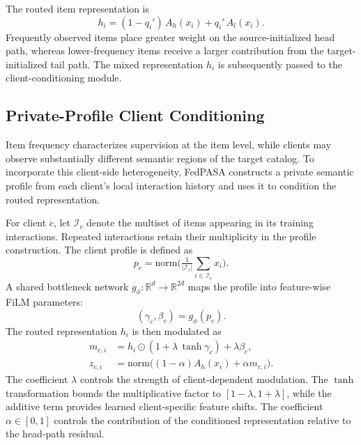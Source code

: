The routed item representation is
\begin{equation}
h_i=(1-q_i')\,A_h(x_i)+q_i'\,A_l(x_i).
\label{eq:routing}
\end{equation}
Frequently observed items place greater weight on the source-initialized head path, whereas lower-frequency items receive a larger contribution from the target-initialized tail path. The mixed representation $h_i$ is subsequently passed to the client-conditioning module.

\subsection{Private-Profile Client Conditioning}
\label{sec:conditioning}

Item frequency characterizes supervision at the item level, while clients may observe substantially different semantic regions of the target catalog. To incorporate this client-side heterogeneity, FedPASA constructs a private semantic profile from each client's local interaction history and uses it to condition the routed representation.

For client $c$, let $\mathcal{I}_c$ denote the multiset of items appearing in its training interactions. Repeated interactions retain their multiplicity in the profile construction. The client profile is defined as
\begin{equation}
p_c=\mathrm{norm}\Big(\tfrac{1}{|\mathcal{I}_c|}\sum_{i\in\mathcal{I}_c} x_i\Big).
\label{eq:profile}
\end{equation}
A shared bottleneck network $g_\phi:\mathbb{R}^d\!\to\!\mathbb{R}^{2d}$ maps the profile into feature-wise FiLM parameters:
\begin{equation}
(\gamma_c,\beta_c)=g_\phi(p_c).
\label{eq:filmparams}
\end{equation}
The routed representation $h_i$ is then modulated as
\begin{equation}
\begin{aligned}
m_{c,i}&=h_i\odot(1+\lambda\,\tanh\gamma_c)+\lambda\beta_c,\\
z_{c,i}&=\mathrm{norm}\big((1-\alpha)A_h(x_i)+\alpha m_{c,i}\big).
\end{aligned}
\label{eq:film}
\end{equation}
The coefficient $\lambda$ controls the strength of client-dependent modulation. The $\tanh$ transformation bounds the multiplicative factor to $[1-\lambda,1+\lambda]$, while the additive term provides learned client-specific feature shifts. The coefficient $\alpha\in[0,1]$ controls the contribution of the conditioned representation relative to the head-path residual.

